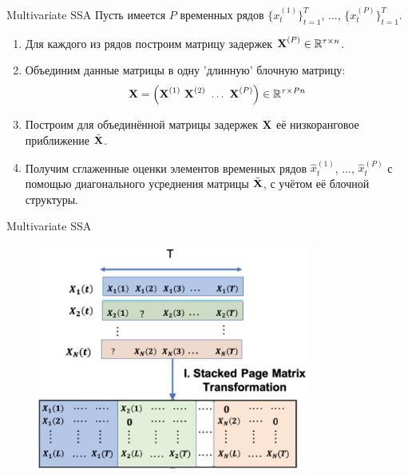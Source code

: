 \begin{frame}{Multivariate SSA}
Пусть имеется $P$ временных рядов $\{ x_t^{(1)} \}_{t=1}^T$, ...,  $\{ x_t^{(P)} \}_{t=1}^T$.
\begin{enumerate}
    \item Для каждого из рядов построим матрицу задержек $\textbf{X}^{(P)} \in \mathbb{R}^{\tau \times n}$.
    \item Объединим данные матрицы в одну 'длинную' блочную матрицу:
    $$ \M{X} = \Big(\M{X}^{(1)} \  \M{X}^{(2)} \ \dots \ \M{X}^{(P)} \Big) \in \mathbb{R}^{\tau \times Pn}$$
    \item Построим для объединённой матрицы задержек $\textbf{X}$ её низкоранговое приближение $\tilde{\textbf{X}}$.
    \item Получим сглаженные оценки элементов временных рядов $ \hat{x}_t^{(1)}$, ...,  $\hat{x}_t^{(P)}$ с помощью диагонального усреднения матрицы $\tilde{\textbf{X}}$, с учётом её блочной структуры.
\end{enumerate}
\end{frame}
\begin{frame}{Multivariate SSA}
\begin{figure}
    \centering
    \includegraphics[width=0.8\textwidth]{lecture_14/figs/mssa_example.png}
\end{figure}
\end{frame}
